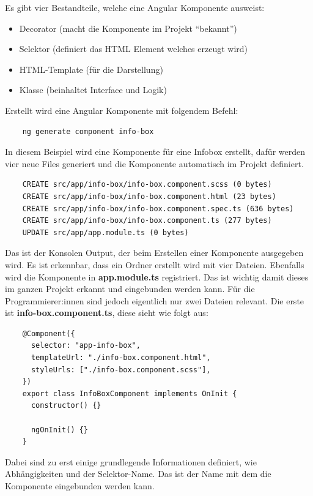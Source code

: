 Es gibt vier Bestandteile, welche eine Angular Komponente ausweist:

\begin{itemize}
    \item Decorator (macht die Komponente im Projekt “bekannt”)
    \item Selektor (definiert das HTML Element welches erzeugt wird)
    \item HTML-Template (für die Darstellung)
    \item Klasse (beinhaltet Interface und Logik)
\end{itemize}

Erstellt wird eine Angular Komponente mit folgendem Befehl:

\begin{lstlisting}
    ng generate component info-box
\end{lstlisting}

In diesem Beispiel wird eine Komponente für eine Infobox erstellt, dafür werden vier neue Files generiert und die Komponente automatisch im Projekt definiert.

\begin{lstlisting}
    CREATE src/app/info-box/info-box.component.scss (0 bytes)
    CREATE src/app/info-box/info-box.component.html (23 bytes)
    CREATE src/app/info-box/info-box.component.spec.ts (636 bytes)
    CREATE src/app/info-box/info-box.component.ts (277 bytes)
    UPDATE src/app/app.module.ts (0 bytes)
\end{lstlisting}

Das ist der Konsolen Output, der beim Erstellen einer Komponente ausgegeben wird. Es ist erkennbar, dass ein Ordner erstellt wird mit vier Dateien. Ebenfalls wird die Komponente in \textbf{app.module.ts} registriert. Das ist wichtig damit dieses im ganzen Projekt erkannt und eingebunden werden kann.
\newpage
Für die Programmierer:innen sind jedoch eigentlich nur zwei Dateien relevant.
Die erste ist \textbf{info-box.component.ts}, diese sieht wie folgt aus:

\begin{lstlisting}
    @Component({
      selector: "app-info-box",
      templateUrl: "./info-box.component.html",
      styleUrls: ["./info-box.component.scss"],
    })
    export class InfoBoxComponent implements OnInit {
      constructor() {}
    
      ngOnInit() {}
    }
\end{lstlisting}

Dabei sind zu erst einige grundlegende Informationen definiert, wie Abhängigkeiten und der Selektor-Name. Das ist der Name mit dem die Komponente eingebunden werden kann.

